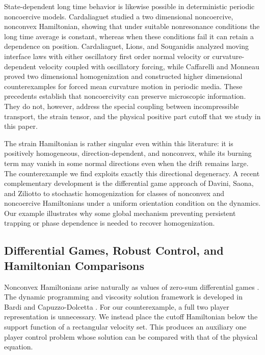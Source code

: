 \documentclass[11pt,reqno,noamsfonts]{amsart}
\theoremstyle{definition}
\theoremstyle{remark}
\begin{document}
State-dependent long time behavior is likewise possible in deterministic
periodic noncoercive models.  Cardaliaguet \cite{Cardaliaguet2010} studied a two dimensional
noncoercive, nonconvex Hamiltonian, showing that under suitable
nonresonance conditions the long time average is constant, whereas
when these conditions fail it can retain a dependence on position.
Cardaliaguet, Lions, and Souganidis \cite{CardaliaguetLionsSouganidis2009}
analyzed moving interface laws with either oscillatory first order
normal velocity or curvature-dependent velocity coupled with oscillatory
forcing, while Caffarelli and Monneau \cite{CaffarelliMonneau2014}
proved two dimensional homogenization and constructed
higher dimensional counterexamples for forced mean curvature motion in
periodic media. These precedents establish that
noncoercivity can preserve microscopic information.  They do not,
however, address the special coupling between incompressible transport,
the strain tensor, and the physical positive part cutoff that we study in this paper.

The strain Hamiltonian is rather singular even within this literature:
it is positively homogeneous, direction-dependent, and nonconvex, while
its burning term may vanish in some normal directions even when the
drift remains large.  The counterexample we find exploits exactly this directional degeneracy.  A recent complementary development is the differential game approach of
Davini, Saona, and Ziliotto \cite{DaviniSaonaZiliotto2026} to stochastic
homogenization for classes of nonconvex and noncoercive Hamiltonians
under a uniform orientation condition on the dynamics. Our example
illustrates why some global mechanism preventing persistent trapping
or phase dependence is needed to recover homogenization.






\subsection{Differential Games, Robust Control, and Hamiltonian Comparisons}
\label{rob-control-sec}
Nonconvex Hamiltonians arise naturally as values of zero-sum differential games \cite{EvansSouganidis1984,Isaacs1965}.  The dynamic programming and viscosity solution framework is developed in Bardi and Capuzzo-Dolcetta \cite{BardiCapuzzoDolcetta1997}.  For our counterexample, a full two player representation is unnecessary.  We instead place the cutoff Hamiltonian below the support function of a rectangular velocity set.  This produces an auxiliary one player control problem whose solution can
be compared with that of the physical equation.
\end{document}

